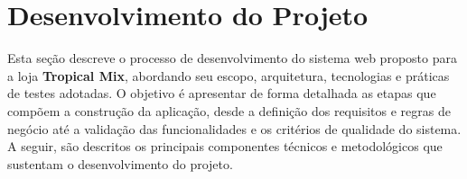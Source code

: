 \chapter{Desenvolvimento do Projeto}
Esta seção descreve o processo de desenvolvimento do sistema web proposto para a loja \textbf{Tropical Mix}, abordando seu escopo, arquitetura, tecnologias e práticas de testes adotadas. O objetivo é apresentar de forma detalhada as etapas que compõem a construção da aplicação, desde a definição dos requisitos e regras de negócio até a validação das funcionalidades e os critérios de qualidade do sistema. A seguir, são descritos os principais componentes técnicos e metodológicos que sustentam o desenvolvimento do projeto.

%






